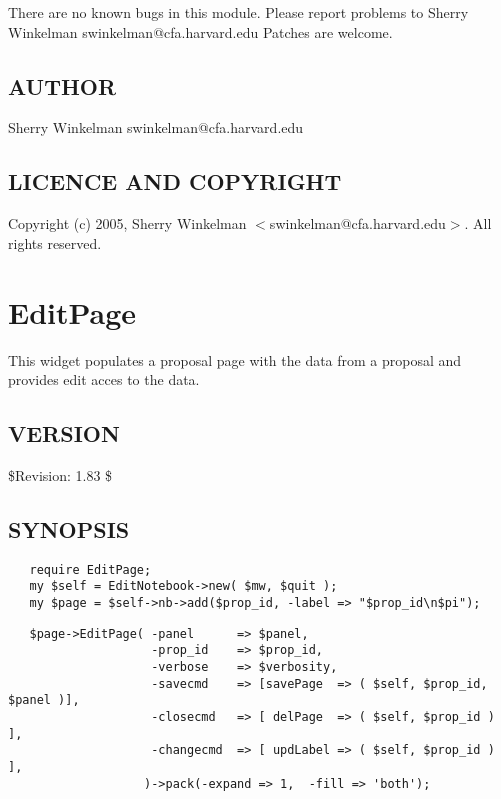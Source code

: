 \documentclass{article}
\begin{document}
There are no known bugs in this module.
Please report problems to Sherry Winkelman swinkelman@cfa.harvard.edu
Patches are welcome.

\subsection*{AUTHOR\label{EditNotebook_AUTHOR}}


Sherry Winkelman swinkelman@cfa.harvard.edu

\subsection*{LICENCE AND COPYRIGHT\label{EditNotebook_LICENCE_AND_COPYRIGHT}}


Copyright (c) 2005, Sherry Winkelman $<$swinkelman@cfa.harvard.edu$>$. All rights 
reserved.

\clearpage
\section{EditPage\label{EditPage}}


This widget populates a proposal page with the data from a proposal
and provides edit acces to the data.

\subsection*{VERSION\label{EditPage_VERSION}}


\$Revision: 1.83 \$

\subsection*{SYNOPSIS\label{EditPage_SYNOPSIS}}
\begin{verbatim}
   require EditPage;
   my $self = EditNotebook->new( $mw, $quit );
   my $page = $self->nb->add($prop_id, -label => "$prop_id\n$pi");
\end{verbatim}
\begin{verbatim}
   $page->EditPage( -panel      => $panel,
                    -prop_id    => $prop_id,
                    -verbose    => $verbosity,
                    -savecmd    => [savePage  => ( $self, $prop_id, $panel )],
                    -closecmd   => [ delPage  => ( $self, $prop_id ) ],
                    -changecmd  => [ updLabel => ( $self, $prop_id ) ],
                   )->pack(-expand => 1,  -fill => 'both');
\end{verbatim}
\end{document}
